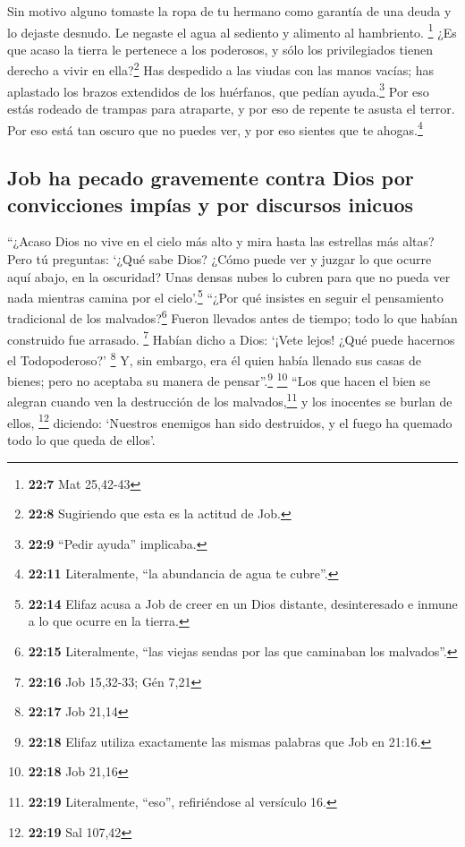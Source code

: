  Sin motivo alguno tomaste la ropa de tu hermano como
garantía de una deuda y lo dejaste desnudo.  Le negaste el
agua al sediento y alimento al hambriento. \footnote{\textbf{22:7} Mat
  25,42-43}  ¿Es que acaso la tierra le pertenece a los
poderosos, y sólo los privilegiados tienen derecho a vivir en
ella?\footnote{\textbf{22:8} Sugiriendo que esta es la actitud de Job.}
 Has despedido a las viudas con las manos vacías; has
aplastado los brazos extendidos de los huérfanos, que pedían
ayuda.\footnote{\textbf{22:9} ``Pedir ayuda'' implicaba.}
 Por eso estás rodeado de trampas para atraparte, y por
eso de repente te asusta el terror.  Por eso está tan
oscuro que no puedes ver, y por eso sientes que te ahogas.\footnote{\textbf{22:11}
  Literalmente, ``la abundancia de agua te cubre''.}

\hypertarget{job-ha-pecado-gravemente-contra-dios-por-convicciones-impuxedas-y-por-discursos-inicuos}{%
\subsection{Job ha pecado gravemente contra Dios por convicciones impías
y por discursos
inicuos}\label{job-ha-pecado-gravemente-contra-dios-por-convicciones-impuxedas-y-por-discursos-inicuos}}

 ``¿Acaso Dios no vive en el cielo más alto y mira hasta
las estrellas más altas?  Pero tú preguntas: `¿Qué sabe
Dios? ¿Cómo puede ver y juzgar lo que ocurre aquí abajo, en la
oscuridad?  Unas densas nubes lo cubren para que no pueda
ver nada mientras camina por el cielo'.\footnote{\textbf{22:14} Elifaz
  acusa a Job de creer en un Dios distante, desinteresado e inmune a lo
  que ocurre en la tierra.}  ``¿Por qué insistes en
seguir el pensamiento tradicional de los malvados?\footnote{\textbf{22:15}
  Literalmente, ``las viejas sendas por las que caminaban los
  malvados''.}  Fueron llevados antes de tiempo; todo lo
que habían construido fue arrasado. \footnote{\textbf{22:16} Job
  15,32-33; Gén 7,21}  Habían dicho a Dios: `¡Vete lejos!
¿Qué puede hacernos el Todopoderoso?' \footnote{\textbf{22:17} Job 21,14}
 Y, sin embargo, era él quien había llenado sus casas de
bienes; pero no aceptaba su manera de pensar''.\footnote{\textbf{22:18}
  Elifaz utiliza exactamente las mismas palabras que Job en 21:16.}
\footnote{\textbf{22:18} Job 21,16}  ``Los que hacen el
bien se alegran cuando ven la destrucción de los malvados,\footnote{\textbf{22:19}
  Literalmente, ``eso'', refiriéndose al versículo 16.} y los inocentes
se burlan de ellos, \footnote{\textbf{22:19} Sal 107,42} 
diciendo: `Nuestros enemigos han sido destruidos, y el fuego ha quemado
todo lo que queda de ellos'.


